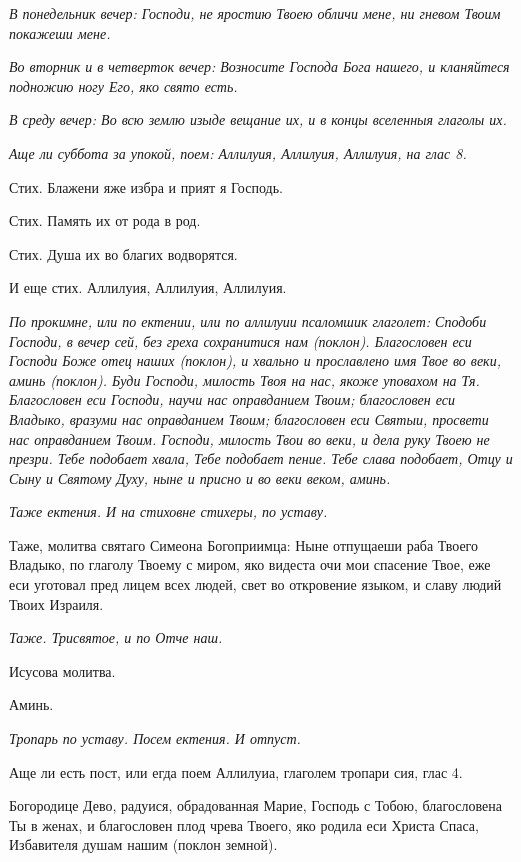 \itshape В понедельник вечер:\normalfont{} Господи, не яростию Твоею обличи мене, ни гневом Твоим покажеши мене.


\itshape Во вторник и в четверток вечер:\normalfont{} Возносите Господа Бога нашего, и кланяйтеся подножию ногу Его, яко свято есть.


\itshape В среду вечер:\normalfont{} Во всю землю изыде вещание их, и в концы вселенныя глаголы их.


\itshape Аще ли суббота за упокой, поем:\normalfont{} Аллилуия, Аллилуия, Аллилуия, на глас 8.

Стих. Блажени яже избра и прият я Господь.

Стих. Память их от рода в род.

Стих. Душа их во благих водворятся.

И еще стих. Аллилуия, Аллилуия, Аллилуия.


\medskip


\itshape По прокимне, или по ектении, или по аллилуии псаломшик глаголет:\normalfont{} Сподоби Господи, в вечер сей, без греха сохранитися нам (поклон). Благословен еси Господи Боже отец наших (поклон), и хвально и прославлено имя Твое во веки, аминь (поклон). Буди Господи, милость Твоя на нас, якоже уповахом на Тя. Благословен еси  Господи, научи нас оправданием Твоим; благословен еси Владыко, вразуми нас оправданием Твоим; благословен еси Святыи, просвети нас оправданием Твоим. Господи, милость Твои во веки, и дела руку Твоею не презри. Тебе подобает хвала, Тебе подобает пение. Тебе слава подобает, Отцу и Сыну и Святому Духу, ныне и присно и во веки веком, аминь.


\medskip


\itshape Таже ектения. И на стиховне стихеры, по уставу.

Таже, молитва святаго Симеона Богоприимца:\normalfont{} Ныне отпущаеши раба Твоего Владыко, по глаголу Твоему с миром, яко видеста очи мои спасение Твое, еже еси уготовал пред лицем всех людей, свет во откровение языком, и славу людий Твоих Израиля.

\itshape Таже. Трисвятое, и по Отче наш.\normalfont{}

Исусова молитва.

Аминь.

\itshape Тропарь по уставу. Посем ектения. И отпуст.

Аще ли есть пост, или егда поем Аллилуиа, глаголем тропари сия, глас 4.\normalfont{}

Богородице Дево, радуися, обрадованная Марие, Господь с Тобою, благословена Ты в женах, и благословен плод чрева Твоего, яко родила еси Христа Спаса, Избавителя душам нашим (поклон земной).

